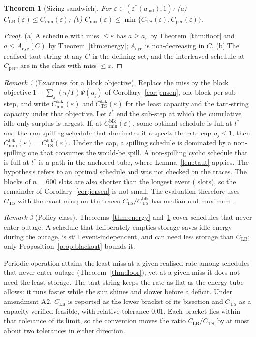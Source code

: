 \documentclass[lettersize,journal]{IEEEtran}
\newtheorem{theorem}{Theorem}
\theoremstyle{definition}
\theoremstyle{remark}
\newtheorem{remark}{Remark}
\newcommand{\eps}{\varepsilon}
\newcommand{\Psif}{\Psi}
\begin{document}
\begin{theorem}[Sizing sandwich]\label{thm:sizing}
For $\eps\in(\eps^*(a_{\mathrm{bal}}),1)$:
(a) $C_{\mathrm{LB}}(\eps)\le C_{\min}(\eps)$;
(b) $C_{\min}(\eps)\le\min\{C_{\mathrm{TS}}(\eps),C_{\mathrm{per}}(\eps)\}$.
\end{theorem}
\begin{proof}
(a) A schedule with miss $\le\eps$ has $a\ge a_\eps$ by Theorem~\ref{thm:floor} and $a\le A_{\mathrm{cyc}}(C)$ by Theorem~\ref{thm:energy}; $A_{\mathrm{cyc}}$ is non-decreasing in $C$.
(b) The realised taut string at any $C$ in the defining set, and the interleaved schedule at $C_{\mathrm{per}}$, are in the class with miss $\le\eps$.
\end{proof}
\begin{remark}[Exactness for a block objective]\label{rem:blk}
Replace the miss by the block objective $1-\sum_j(n/T)\Psif(a_j)$ of Corollary~\ref{cor:jensen}, one block per sub-step, and write $C^{\mathrm{blk}}_{\min}(\eps)$ and $C^{\mathrm{blk}}_{\mathrm{TS}}(\eps)$ for the least capacity and the taut-string capacity under that objective. Let $t^*$ end the sub-step at which the cumulative idle-only surplus is largest. If, at $C^{\mathrm{blk}}_{\min}(\eps)$, some optimal schedule is full at $t^*$ and the non-spilling schedule that dominates it respects the rate cap $a_j\le1$, then $C^{\mathrm{blk}}_{\min}(\eps)=C^{\mathrm{blk}}_{\mathrm{TS}}(\eps)$. Under the cap, a spilling schedule is dominated by a non-spilling one that consumes the would-be spill. A non-spilling cyclic schedule that is full at $t^*$ is a path in the anchored tube, where Lemma~\ref{lem:taut} applies. The hypothesis refers to an optimal schedule and was not checked on the traces. The blocks of $n=600$ slots are also shorter than the longest event (\Dmax{} slots), so the remainder of Corollary~\ref{cor:jensen} is not small. The evaluation therefore uses $C_{\mathrm{TS}}$ with the exact miss; on the traces $C_{\mathrm{TS}}/C^{\mathrm{blk}}_{\mathrm{TS}}$ has median \AiiTSratioMed{} and maximum \AiiTSratioMax.
\end{remark}
\begin{remark}[Policy class]\label{rem:class}
Theorems~\ref{thm:energy} and~\ref{thm:sizing} cover schedules that never enter outage. A schedule that deliberately empties storage saves idle energy during the outage, is still event-independent, and can need less storage than $C_{\mathrm{LB}}$; only Proposition~\ref{prop:blackout} bounds it.
\end{remark}
\noindent Periodic operation attains the least miss at a given realised rate among schedules that never enter outage (Theorem~\ref{thm:floor}), yet at a given miss it does not need the least storage. The taut string keeps the rate as flat as the energy tube allows: it runs faster while the sun shines and slower before a deficit. Under amendment A2, $C_{\mathrm{LB}}$ is reported as the lower bracket of its bisection and $C_{\mathrm{TS}}$ as a capacity verified feasible, with relative tolerance 0.01. Each bracket lies within that tolerance of its limit, so the convention moves the ratio $C_{\mathrm{LB}}/C_{\mathrm{TS}}$ by at most about two tolerances in either direction.
\end{document}
